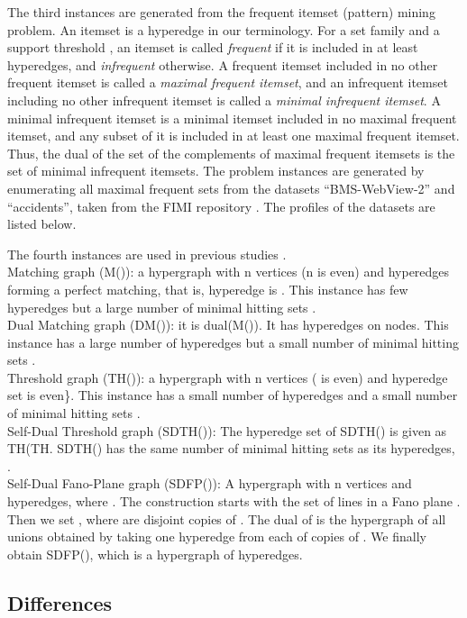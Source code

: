 The third instances are generated from the frequent itemset (pattern) mining
 problem.
An itemset is a hyperedge in our terminology.
For a set family  and a support threshold , an itemset is
 called {\em frequent} if it is included in at least  hyperedges, 
 and {\em infrequent} otherwise.
A frequent itemset included in no other frequent itemset is called a
 {\em maximal frequent itemset}, and an infrequent itemset including no
 other infrequent itemset is called a {\em minimal infrequent itemset}.
A minimal infrequent itemset is a minimal itemset included in no maximal
 frequent itemset, and any subset of it is included in at least one maximal
 frequent itemset.
Thus, the dual of the set of the complements of maximal frequent itemsets
 is the set of minimal infrequent itemsets.
The problem instances are generated by enumerating all maximal frequent sets
 from the datasets ``BMS-WebView-2'' and ``accidents'', taken from the
 FIMI repository \cite{FIMI}.
The profiles of the datasets are listed below.

The fourth instances are used in previous studies \cite{KvSt05,BeEk03}.\\
  Matching graph (M()): 
a hypergraph with n vertices (n is even) and  hyperedges forming a
 perfect matching, that is, hyperedge  is .
This instance has few hyperedges but a large number of minimal
 hitting sets .\\
 Dual Matching graph (DM()): it is dual(M()).
It has  hyperedges on  nodes.
This instance has a large number of hyperedges but a small number of minimal
 hitting sets .\\
 Threshold graph (TH()): a hypergraph with n vertices
 ( is even) and hyperedge set  is even\}.
This instance has a small number of hyperedges  and a small number of
 minimal hitting sets .\\
 Self-Dual Threshold graph (SDTH()):
The hyperedge set of SDTH() is given as TH(TH.
SDTH() has the same number of minimal hitting sets as its hyperedges,
 .\\
 Self-Dual Fano-Plane graph (SDFP()): 
A hypergraph with n vertices and  hyperedges,
 where .
The construction starts with the set of lines
 in a Fano plane   
    .
Then we set ,
 where  are  disjoint copies of .
The dual of  is the hypergraph of all  unions obtained by
 taking one hyperedge from each of  copies of .
We finally obtain SDFP(), which is a hypergraph of  hyperedges.

\subsection{Differences}

